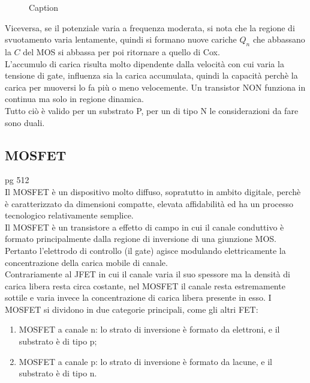 \begin{figure}[hbt!]
    \centering
    \caption{Caption}%
    \label{fig:enter-label}
\end{figure}


Viceversa, se il potenziale varia a frequenza moderata, si nota che la regione di svuotamento varia lentamente, quindi si formano nuove cariche $Q_n$ che abbassano la $C$ del MOS si abbassa per poi ritornare a quello di Cox. \\

L'accumulo di carica risulta molto dipendente dalla velocità con cui varia la tensione di gate, influenza sia la carica accumulata, quindi la capacità perchè la carica per muoversi lo fa più o meno velocemente. Un transistor NON funziona in continua ma solo in regione dinamica.\\
Tutto ciò è valido per un substrato P, per un di tipo N le considerazioni da fare sono duali.

\subsection{MOSFET} pg 512\\
Il MOSFET è un dispositivo molto diffuso, sopratutto in ambito digitale, perchè è caratterizzato da dimensioni compatte, elevata affidabilità ed ha un processo tecnologico relativamente semplice. \\
Il MOSFET è un transistore a effetto di campo in cui il canale conduttivo è formato principalmente dalla regione di inversione di una giunzione MOS. Pertanto l'elettrodo di controllo (il gate) agisce modulando elettricamente la concentrazione della carica mobile di canale. \\
Contrariamente al JFET in cui il canale varia il suo spessore ma la densità di carica libera resta circa costante, nel MOSFET il canale resta estremamente sottile e varia invece la concentrazione di carica libera presente in esso.
I MOSFET si dividono in due categorie principali, come gli altri FET: 
\begin{enumerate}
    \item MOSFET a canale n: lo strato di inversione è formato da elettroni, e il
substrato è di tipo p;
\item MOSFET a canale p: lo strato di inversione è formato da lacune, e il substrato
è di tipo n.
\end{enumerate}

